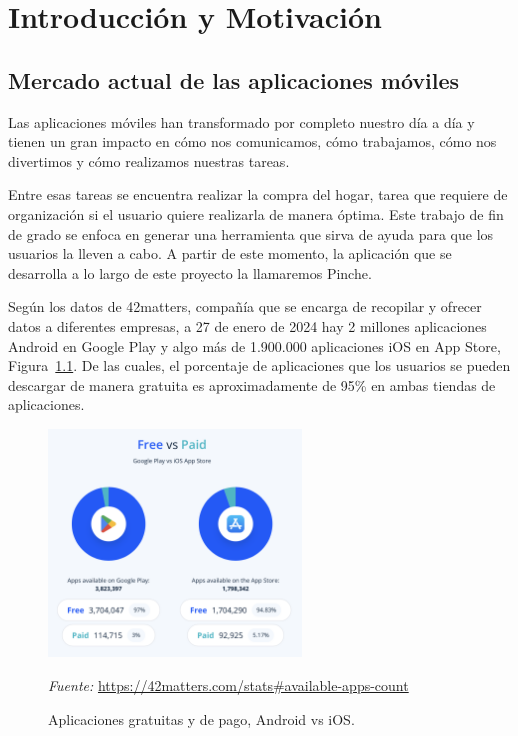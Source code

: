 \cleardoublepage
\chapter{Introducción y Motivación}
\label{sec:intro} %


\section{Mercado actual de las aplicaciones móviles}

Las aplicaciones móviles han transformado por completo nuestro día  a día y tienen un gran impacto en cómo nos comunicamos, cómo trabajamos, cómo nos divertimos y cómo realizamos nuestras tareas.

Entre esas tareas se encuentra realizar la compra del hogar, tarea que requiere de organización si el usuario quiere realizarla de manera óptima. Este trabajo de fin de grado se enfoca en generar una herramienta que sirva de ayuda para que los usuarios la lleven a cabo. A partir de este momento, la aplicación que se desarrolla a lo largo de este proyecto la llamaremos Pinche.

Según los datos de 42matters, compañía que se encarga de recopilar y ofrecer datos a diferentes empresas, a 27 de enero de 2024 hay 2 millones aplicaciones Android en Google Play y algo más de 1.900.000 aplicaciones iOS en App Store, Figura~\ref{fig:apps_free_vs_pay}. De las cuales, el porcentaje de aplicaciones que los usuarios se pueden descargar de manera gratuita es aproximadamente de 95\% en ambas tiendas de aplicaciones.

\begin{figure}[H]
\centering
\includegraphics[width=0.6\textwidth]{./img/intro/apps_free_vs_pay.png}
\caption{Aplicaciones gratuitas y de pago, Android vs iOS.}
\label{fig:apps_free_vs_pay}
\vspace{0.2em}
{\footnotesize \centering \textit{Fuente:} \url{https://42matters.com/stats#available-apps-count} \par}
\end{figure}

